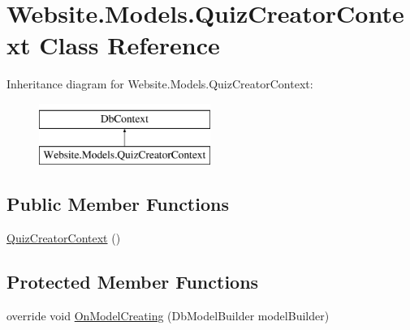 \hypertarget{class_website_1_1_models_1_1_quiz_creator_context}{}\section{Website.\+Models.\+Quiz\+Creator\+Context Class Reference}
\label{class_website_1_1_models_1_1_quiz_creator_context}
Inheritance diagram for Website.\+Models.\+Quiz\+Creator\+Context\+:\begin{figure}[H]
\begin{center}
\leavevmode
\includegraphics[height=2.000000cm]{class_website_1_1_models_1_1_quiz_creator_context}
\end{center}
\end{figure}
\subsection*{Public Member Functions}
\begin{DoxyCompactItemize}
\item 
\hyperlink{class_website_1_1_models_1_1_quiz_creator_context_a47169eb054444d09e3fed4e50baf7b66}{Quiz\+Creator\+Context} ()
\end{DoxyCompactItemize}
\subsection*{Protected Member Functions}
\begin{DoxyCompactItemize}
\item 
override void \hyperlink{class_website_1_1_models_1_1_quiz_creator_context_aad634598577601273f098917ff275509}{On\+Model\+Creating} (Db\+Model\+Builder model\+Builder)
\end{DoxyCompactItemize}
